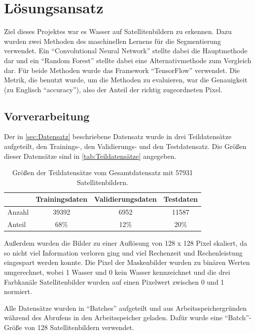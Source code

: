 \section{Lösungsansatz}
\label{sec:Lösungsansatz}

Ziel dieses Projektes war es Wasser auf Satellitenbildern zu erkennen.
Dazu wurden zwei Methoden des maschinellen Lernens für die Segmentierung verwendet.
Ein \enquote{Convolutional Neural Network} stellte dabei die Hauptmethode dar 
und ein \enquote{Random Forest} stellte dabei eine Alternativmethode zum Vergleich dar.
Für beide Methoden wurde das Framework \enquote{TensorFlow} verwendet.\cite{tensorflow}
Die Metrik, die benutzt wurde, um die Methoden zu evaluieren, war die Genauigkeit (zu Englisch \enquote{accuracy}), 
also der Anteil der richtig zugeordneten Pixel.

\subsection{Vorverarbeitung}
\label{ssec:Vorverarbeitung}

Der in \autoref{sec:Datensatz} beschriebene Datensatz wurde in drei Teildatensätze aufgeteilt,
den Trainings-, den Validierungs- und den Testdatensatz.
Die Größen dieser Datensätze sind in \autoref{tab:Teildatensätze} angegeben.

\begin{table}
    \centering
    \caption{Größen der Teildatensätze vom Gesamtdatensatz mit 57931 Satellitenbildern.}
    \label{tab:Teildatensätze}
    \begin{tabular}{l c c c}
        \toprule 
        & Trainingsdaten & Validierungsdaten & Testdaten \\ 
        \midrule 
        Anzahl & 39392 & 6952 & 11587 \\
        Anteil & 68\% & 12\% & 20\% \\
        \bottomrule
    \end{tabular}
\end{table}

Außerdem wurden die Bilder zu einer Auflösung von 128 x 128 Pixel skaliert, 
da so nicht viel Information verloren ging und viel Rechenzeit und Rechenleistung eingespart werden konnte.
Die Pixel der Maskenbilder wurden zu binären Werten umgerechnet, wobei 1 Wasser und 0 kein Wasser kennzeichnet
und die drei Farbkanäle Satellitenbilder wurden auf einen Pixelwert zwischen 0 und 1 normiert. 

Alle Datensätze wurden in \enquote{Batches} aufgeteilt und aus Arbeitsspeichergründen während des Abrufens in den Arbeitsspeicher geladen.
Dafür wurde eine \enquote{Batch}-Größe von 128 Satellitenbildern verwendet.

